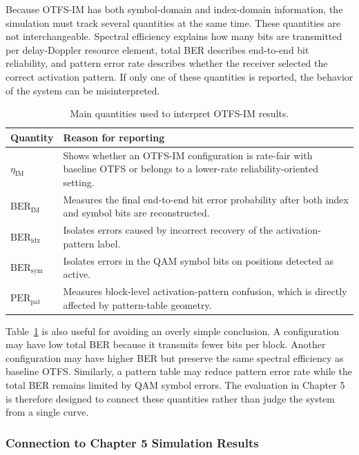 Because OTFS-IM has both symbol-domain and index-domain information, the simulation must track several quantities at the same time. These quantities are not interchangeable. Spectral efficiency explains how many bits are transmitted per delay-Doppler resource element, total BER describes end-to-end bit reliability, and pattern error rate describes whether the receiver selected the correct activation pattern. If only one of these quantities is reported, the behavior of the system can be misinterpreted.

\begin{table}[H]
\centering
\caption{Main quantities used to interpret OTFS-IM results.}
\label{tab:otfs_im_evaluation_quantities}
\begin{tabularx}{0.95\linewidth}{|p{3.0cm}|X|}
\hline
\textbf{Quantity} & \textbf{Reason for reporting} \\
\hline
\(\eta_{\mathrm{IM}}\) & Shows whether an OTFS-IM configuration is rate-fair with baseline OTFS or belongs to a lower-rate reliability-oriented setting. \\
\hline
\(\mathrm{BER}_{\mathrm{IM}}\) & Measures the final end-to-end bit error probability after both index and symbol bits are reconstructed. \\
\hline
\(\mathrm{BER}_{\mathrm{idx}}\) & Isolates errors caused by incorrect recovery of the activation-pattern label. \\
\hline
\(\mathrm{BER}_{\mathrm{sym}}\) & Isolates errors in the QAM symbol bits on positions detected as active. \\
\hline
\(\mathrm{PER}_{\mathrm{pat}}\) & Measures block-level activation-pattern confusion, which is directly affected by pattern-table geometry. \\
\hline
\end{tabularx}
\end{table}

Table~\ref{tab:otfs_im_evaluation_quantities} is also useful for avoiding an overly simple conclusion. A configuration may have low total BER because it transmits fewer bits per block. Another configuration may have higher BER but preserve the same spectral efficiency as baseline OTFS. Similarly, a pattern table may reduce pattern error rate while the total BER remains limited by QAM symbol errors. The evaluation in Chapter 5 is therefore designed to connect these quantities rather than judge the system from a single curve.

\subsubsection{Connection to Chapter 5 Simulation Results}

